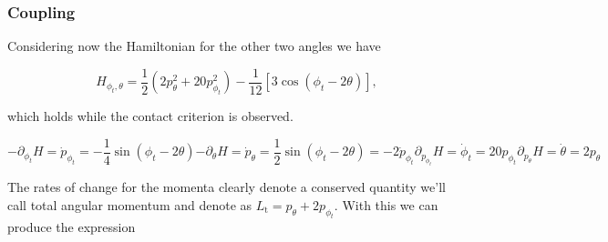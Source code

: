 \documentclass[prbg,preprint]{revtex4-1}
\begin{document}
\subsubsection{Coupling}

Considering now the Hamiltonian for the other two angles we have

\begin{equation}
	H_{\phi_t, \theta}=
	\frac{1}{2}\left (
	2 p_\theta^2
	+20 p_{\phi_t}^2 
        \right )
	-
	\frac{1}{12}
	[
	        3\cos(\phi_t-2\theta)
	    ],
\end{equation}

which holds while the contact criterion is observed.

\begin{subequations}
	\begin{equation}\label{f_phit}
		-\partial_{\phi_t}H= \dot p_{\phi_t} 
		= - \frac{1}{4} \sin{\left (\phi_{t} - 2 \theta \right )}
	\end{equation}
	\begin{equation}\label{f_tht}
		-\partial_{\theta}H= \dot p_{\theta}  
		= \frac{1}{2} \sin{\left (\phi_{t} - 2 \theta \right )}
		=-2\dot p_{\phi_t}
	\end{equation}
	\begin{equation}
		\partial_{p_{\phi_t}}H= \dot \phi_t 
		= 20 p_{\phi_t}
	\end{equation}
	\begin{equation}
		\partial_{p_{\theta}}H= \dot \theta 
		= 2 p_{\theta}
	\end{equation}
\end{subequations}

The rates of change for the momenta clearly denote a conserved quantity we'll call total angular momentum and denote as 
$L_\textrm{t} = p_\theta + 2p_{\phi_t}$. 
With this we can produce the expression
\end{document}
